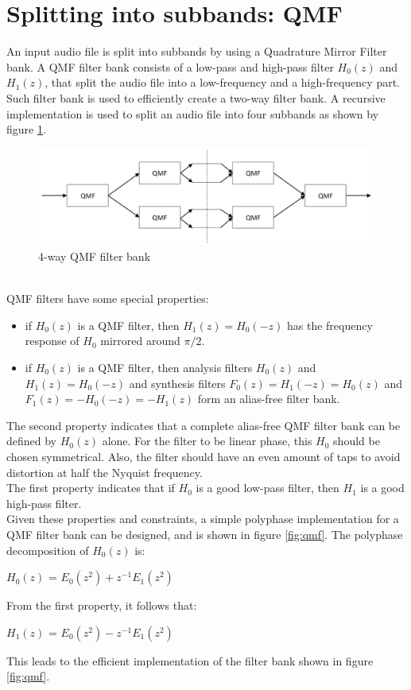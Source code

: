 \documentclass[a4paper]{article}
\begin{document}
\section{Splitting into subbands: QMF}
An input audio file is split into subbands by using a Quadrature Mirror Filter bank.
A QMF filter bank consists of a low-pass and high-pass filter $H_0(z)$ and $H_1(z)$, that split the audio file into a low-frequency and a high-frequency part. Such filter bank is used to efficiently create a two-way filter bank. A recursive implementation is used to split an audio file into four subbands as shown by figure \ref{fig:qmfrecursive}.\\
\begin{figure}[hbt]
\includegraphics[width = \textwidth]{qmfrecursive}
\caption{4-way QMF filter bank}
\label{fig:qmfrecursive}
\end{figure} \\
QMF filters have some special properties:
\begin{itemize}
\item if $H_0(z)$ is a QMF filter, then $H_1(z) = H_0(-z)$ has the frequency response of $H_0$ mirrored around $\pi/2$.
\item if $H_0(z)$ is a QMF filter, then analysis filters $H_0(z)$ and $H_1(z) = H_0(-z)$ and synthesis filters $F_0(z)=H_1(-z)=H_0(z)$ and $F_1(z)=-H_0(-z) = -H_1(z)$ form an alias-free filter bank.
\end{itemize}

The second property indicates that a complete alias-free QMF filter bank can be defined by $H_0(z)$ alone. For the filter to be linear phase, this $H_0$ should be chosen symmetrical. Also, the filter should have an even amount of taps to avoid distortion at half the Nyquist frequency. \\

The first property indicates that if $H_0$ is a good low-pass filter, then $H_1$ is a good high-pass filter. \\

Given these properties and constraints, a simple polyphase implementation for a QMF filter bank can be designed, and is shown in figure \ref{fig:qmf}. The polyphase decomposition of $H_0(z)$ is:\\
\begin{center}
$H_0(z)$ = $E_0(z^2) + z^{-1} E_1(z^2)$ \\
\end{center}
From the first property, it follows that: \\
\begin{center}
$H_1(z)$ = $E_0(z^2) - z^{-1} E_1(z^2)$ \\
\end{center}
This leads to the efficient implementation of the filter bank shown in figure \ref{fig:qmf}.
\end{document}
